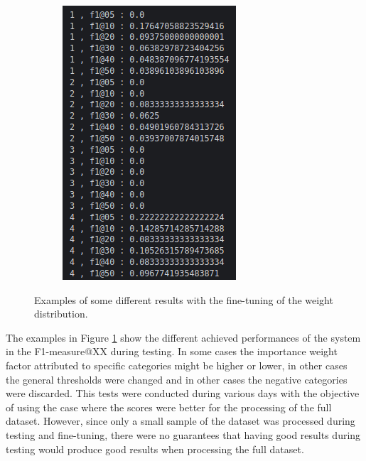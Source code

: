 \begin{figure}[H]
\begin{subfigure}{0.22\textwidth}
  \end{subfigure}
  \begin{subfigure}{0.22\textwidth}
  \includegraphics[width=\textwidth]{Sections/7Results/images/runexample4.png}\hfill
  \end{subfigure}
  \caption[Fine-tuning results examples.]{Examples of some different results with the fine-tuning of the weight distribution.}
  \label{fig:fine_tuning}
\end{figure}


The examples in Figure \ref{fig:fine_tuning} show the different achieved performances of the system in the F1-measure@XX during testing. In some cases the importance weight factor attributed to specific categories might be higher or lower, in other cases the general thresholds were changed and in other cases the negative categories were discarded. This tests were conducted during various days with the objective of using the case where the scores were better for the processing of the full dataset. However, since only a small sample of the dataset was processed during testing and fine-tuning, there were no guarantees that having good results during testing would produce good results when processing the full dataset.



